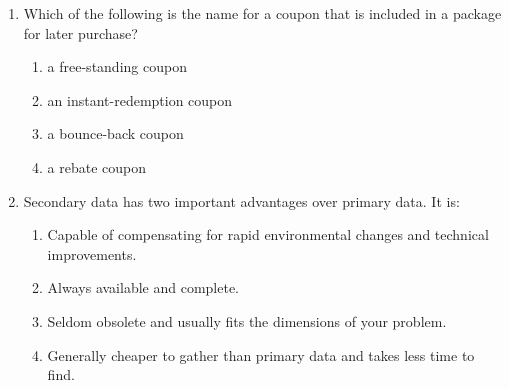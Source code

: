 \documentclass[12pt]{article}
\begin{document}
\begin{enumerate}[label=\arabic*.]
\begin{enumerate}[label=(\alph*)]
    \item Both have the potential to damage an organisation's reputation.
\end{enumerate}
\item Which of the following is the name for a coupon that is included in a package for later purchase?
\begin{enumerate}[label=(\alph*)]
    \item a free-standing coupon
    \item an instant-redemption coupon
    \item a bounce-back coupon
    \item a rebate coupon
\end{enumerate}
\item Secondary data has two important advantages over primary data. It is:
\begin{enumerate}[label=(\alph*)]
    \item Capable of compensating for rapid environmental changes and technical improvements.
    \item Always available and complete.
    \item Seldom obsolete and usually fits the dimensions of your problem.
    \item Generally cheaper to gather than primary data and takes less time to find.
\end{enumerate}
\end{enumerate}
\end{document}
